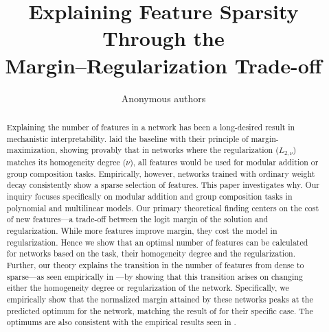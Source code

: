 \documentclass{article} %
\title{Explaining Feature Sparsity Through the\\ Margin--Regularization Trade-off}
\author{Anonymous authors}
\theoremstyle{plain}
\theoremstyle{definition}
\theoremstyle{remark}
\begin{document}
\maketitle

\begin{abstract}
Explaining the number of features in a network has been a long-desired result in mechanistic interpretability. \citet{morwani2024feature} laid the baseline with their principle of margin-maximization, showing provably that in networks where the regularization ($L_{2,\nu}$) matches its homogeneity degree ($\nu$), all features would be used for modular addition or group composition tasks. Empirically, however, networks trained with ordinary weight decay consistently show a sparse selection of features. This paper investigates why.
Our inquiry focuses specifically on modular addition and group composition tasks in polynomial and multilinear models. Our primary theoretical finding centers on the cost of new features---a trade-off between the logit margin of the solution and regularization. While more features improve margin, they cost the model in regularization. Hence we show that an optimal number of features can be calculated for networks based on the task, their homogeneity degree and the regularization. Further, our theory explains the transition in the number of features from dense to sparse---as seen empirically in \citet{mccracken2025}---by showing that this transition arises on changing either the homogeneity degree or regularization of the network.
Specifically, we empirically show that the normalized margin attained by these networks peaks at the predicted optimum for the network, matching the result of \citet{morwani2024feature} for their specific case. The optimums are also consistent with the empirical results seen in \citet{chughtai2023toy}.
\end{abstract}
\end{document}
